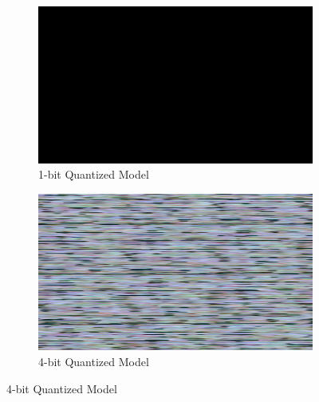     \begin{figure}[H]
        \centering
        \begin{subfigure}[b]{0.4\textwidth}
            \centering
            \includegraphics[width=\textwidth]{assets/quantization/frames/rickq1.png}
            \caption{1-bit Quantized Model}
            \label{fig:rickq1}
        \end{subfigure}
        \begin{subfigure}[b]{0.4\textwidth}
            \centering
            \includegraphics[width=\textwidth]{assets/quantization/frames/rickq4.png}
            \caption{4-bit Quantized Model}
            \label{fig:rickq4}
        \end{subfigure}
    

\end{figure}
